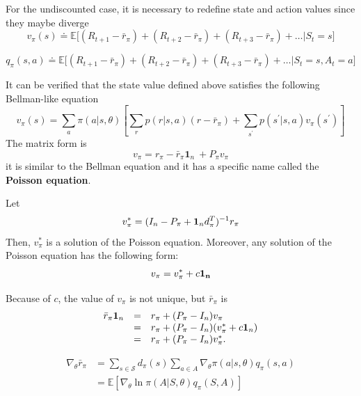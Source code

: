 \documentclass[10pt]{elegantbook}
\begin{document}
For the undiscounted case, it is necessary to redefine state and action values since they maybe diverge
\[
    v_{\pi}(s)\doteq\mathbb{E} \big [(R_{t+1}-{\bar{r}}_{\pi})+(R_{t+2}-{\bar{r}}_{\pi})+(R_{t+3}-{\bar{r}}_{\pi})+\dots | S_{t}=s \big]
\]

\[
    q_{\pi}(s,a)\doteq\mathbb{E} \big [(R_{t+1}-{\bar{r}}_{\pi})+(R_{t+2}-{\bar{r}}_{\pi})+(R_{t+3}-{\bar{r}}_{\pi})+\dots | S_{t}=s,A_{t}=a \big ]
\]

It can be verified that the state value defined above satisfies the following Bellman-like equation
\begin{equation}
    v_{\pi}(s)=\sum_{a}\pi(a|s,\theta)\left[\sum_{r}p(r|s,a)(r-{\bar{r}}_{\pi})+\sum_{s^{\prime}}p(s^{\prime}|s,a)v_{\pi}(s^{\prime})\right]
\end{equation}
The matrix form is 
\[
    v_{\pi} = r_{\pi} - \bar r_{\pi}\mathbf 1_{n}\ +P_{\pi}v_{\pi}
\]
it is similar to the Bellman equation and it has a specific name called the \textbf{Poisson equation}.

\begin{theorem}
    Let 
    \begin{equation}
        v_{\pi}^{\ast}=(I_{n}-P_{\pi}+{\bf 1}_{n}d_{\pi}^{T})^{-1}r_{\pi}
    \end{equation}
    Then, $v_{\pi}^{\ast}$ is a solution of the Poisson equation. Moreover, any solution of the
Poisson equation has the following form:
    \[ v_{\pi} = v_{\pi}^{\ast} + c \bf 1_n \]
\end{theorem}

Because of $c$, the value of $v_{\pi}$ is not unique, but $\bar r_{\pi}$ is
\[
\begin{array}{lll}
    \bar{r}_{\pi}{\bf1}_{n} &=& r_{\pi}+(P_{\pi}-I_{n})v_{\pi} \\ 
    \phantom{\qquad} &=& r_{\pi}+(P_{\pi}-I_{n})(v_{\pi}^{*}+c{\bf1}_{n}) \\ 
    \phantom{\qquad} &=& r_{\pi}+(P_{\pi}-I_{n})v_{\pi}^{*}.
\end{array}
\]

\begin{theorem}
    \begin{equation}
        \begin{aligned}
        \nabla_{\theta}\bar{r}_{\pi} &=\sum_{s\in{\mathcal{S}}}d_{\pi}(s)\sum_{a\in A}\nabla_{\theta}\pi(a|s,\theta)q_{\pi}(s,a) \\
        &= \mathbb{E}\left[\nabla_{\theta}\ln\pi(A|S,\theta)q_{\pi}(S,A)\right]
        \end{aligned}
    \end{equation}
\end{theorem}
\end{document}
